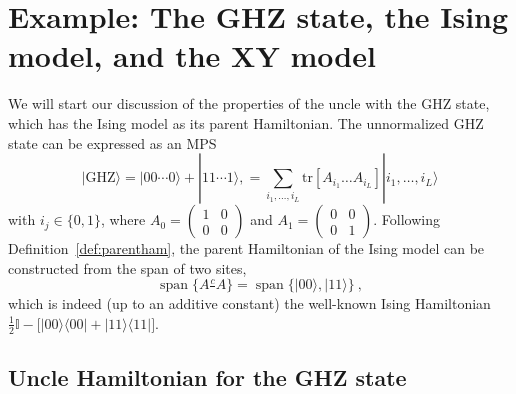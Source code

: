 \documentclass[cmp]{svjour}
\newcommand{\tr}{\mathrm{tr}}
\newcommand{\I}{\mathbb{I}}
\DeclareMathOperator{\spann}{span}
\newcommand{\bra}[1]{\langle #1|}
\newcommand{\ket}[1]{|#1\rangle}
\def\cont{\tfrac{c}{\ \ }}
\begin{document}
\section{\label{sec:example}
  Example: The GHZ state, the Ising model, and the XY model}

We will start our discussion of the properties of the uncle with the GHZ
state, which has the Ising model as its
parent Hamiltonian. The unnormalized GHZ state can be expressed as an MPS
\begin{equation*}
    \ket{\mathrm{GHZ}}
    = \ket{00\cdots0}+\ket{11\cdots1},
    =\sum _{i_1,\dots,i_L}
    \tr[A_{i_1} \dots A_{i_L}] \ket{ i_1,\dots,i_L}
\end{equation*}
with  $i_j \in \{0,1\}$, where
$A_0= \left( \begin{smallmatrix}
            1 & 0 \\ 0 & 0 \end{smallmatrix} \right)$ and
$A_1=\left( \begin{smallmatrix}
            0 & 0 \\ 0 & 1 \end{smallmatrix} \right)$. Following
Definition~\ref{def:parentham},
the parent Hamiltonian of the Ising model can be constructed from the
span of two sites,
\[
    \spann\{A\cont A\}=\spann\{\ket{00},\ket{11}\}\ ,
\]
which is indeed (up to an additive constant) the well-known Ising
Hamiltonian $\tfrac12\I-\big[\ket{00}\bra{00}+\ket{11}\bra{11}\big]$.

\subsection{Uncle Hamiltonian for the GHZ state}
\end{document}
